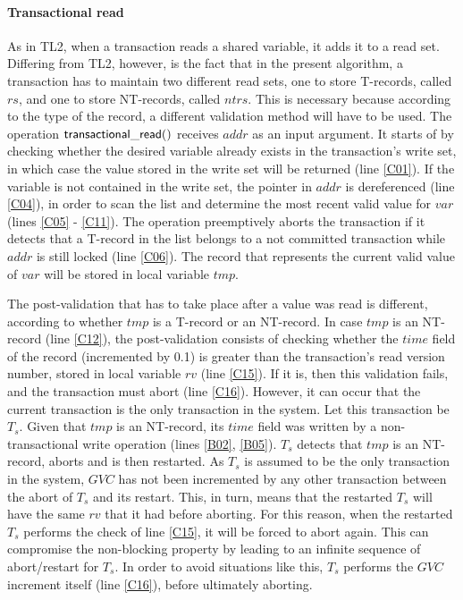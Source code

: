 \documentclass[11pt,letterpaper]{article}
\begin{document}
\paragraph{Transactional read}
As in TL2, when a transaction reads a shared variable, it adds it to a read
set. Differing from TL2,  
however, is  the fact that in  the present algorithm, a  transaction has to
maintain two different read sets,  
one to store T-records, called  $\mathit{rs}$, and one to store NT-records,
called $\mathit{ntrs}$. This is necessary  
because according to the type  of the record, a different validation method
will have to be used.  
The operation ${\sf  transactional\_read()}$ receives $\mathit{addr}$ as an
input argument. It starts of by checking  
whether the  desired variable already  exists in the  transaction{}'s write
set, in which  
case  the   value  stored  in  the   write  set  will   be  returned  (line
\ref{C01}). If the variable is not contained  
in  the write  set, the  pointer in  $\mathit{addr}$ is  dereferenced (line
\ref{C04}), in order to scan the list and  
determine the most recent valid value for $\mathit{var}$ 
(lines \ref{C05} - \ref{C11}). The operation preemptively 
aborts the transaction if it detects that a T-record in the 
list belongs to a not committed transaction 
while $\mathit{addr}$ is still locked (line \ref{C06}). 
The record that represents the current valid value of 
$\mathit{var}$ will be stored in local variable $\mathit{tmp}$. 

The post-validation that has to take place after a value was read is different, 
according to whether $\mathit{tmp}$ is a T-record or an NT-record. 
In case $\mathit{tmp}$ is an 
NT-record (line \ref{C12}), the post-validation consists of 
checking whether the $\mathit{time}$ 
field of the record (incremented by 0.1) is greater than the 
transaction{}'s read version number, 
stored in local variable $\mathit{rv}$ (line \ref{C15}). 
If it is, then this validation fails, and the 
transaction must abort (line \ref{C16}). However, it can occur 
that the current 
transaction is the only transaction in the system. 
Let this transaction be $\mathit{T_s}$.
Given that $\mathit{tmp}$ is an NT-record, its $\mathit{time}$ 
field was written by a non-transactional 
write operation (lines \ref{B02}, \ref{B05}). $\mathit{T_s}$ 
detects that $\mathit{tmp}$ is an NT-record, 
aborts and is then restarted.  As $\mathit{T_s}$ is assumed 
to be the only transaction in the system, 
$\mathit{GVC}$ has not been incremented by any other transaction 
between the abort of $\mathit{T_s}$ 
and its restart. This, in turn, means that the restarted 
$\mathit{T_s}$ will have the same $\mathit{rv}$ that 
it had before aborting. For this reason, when the restarted 
$\mathit{T_s}$ performs the check of line \ref{C15}, 
it will be forced to abort again. This can compromise the 
non-blocking   property   by   leading    to  an   infinite   
sequence   of  abort/restart for $\mathit{T_s}$.  
In order to avoid situations like this, $\mathit{T_s}$  performs the 
$\mathit{GVC}$ increment itself (line \ref{C16}), before ultimately aborting. 
\end{document}
